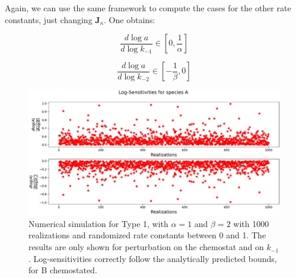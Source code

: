 \documentclass{article}
\begin{document}
	Again, we can use the same framework to compute the cases for the other rate constants, just changing $\mathbf{J}_{\kappa}$. One obtains:
	
	\begin{center}
		\begin{equation}
			\frac{d \log a}{d \log k_{-1}} \in \left[0, \frac{1}{\alpha} \right]
		\end{equation}
	\end{center}
	

	
	\begin{center}
		\begin{equation}
			\frac{d \log a}{d \log k_{-2}} \in \left[-\frac{1}{\beta},0 \right]
		\end{equation}
	\end{center}
	
	\begin{figure}[H]
		\centering
		\includegraphics[width=1 \linewidth]{Sens_type1_chemoX2.pdf}
		\caption{\small{Numerical simulation for Type 1, with $\alpha = 1$ and $\beta = 2$ with 1000 realizations and randomized rate constants between 0 and 1. The results are only shown for perturbation on the chemostat and on $k_{-1}$. Log-sensitivities correctly follow the analytically predicted bounds, for B chemostated.}}
		\label{Fig. 2}
	\end{figure}
	
\end{document}

